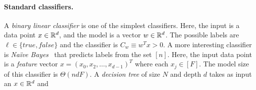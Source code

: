 \paragraph{Standard classifiers.}
A {\em binary linear classifier} is one of the simplest classifiers. Here,
the input is a data point $x\in{\mathbb{R}}^d$,
and the model is a vector $w\in{\mathbb{R}}^d$.
 The possible labels are
$\ell\in \{ true, false \}$ and the classifier is
$C_w\equiv w^Tx>0$.
%
A more interesting classifier is {\em Na\"{i}ve Bayes}~\cite{shafindss} that predicts labels
from the set $[n]$.
Here, the input data point is a {\it feature}
vector $x=(x_0,x_2,\ldots,x_{d-1})^T$ where each $x_j\in [F]$.
The model size of this classifier is $\Theta(ndF)$.
%
A {\em decision tree} of size $N$ and depth $d$ takes as input an $x\in{\mathbb{R}}^d$
 and 

